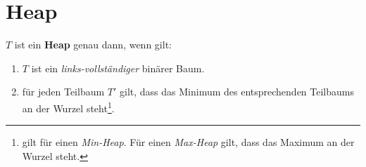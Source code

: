 \section{Heap}

$T$ ist ein \textbf{Heap} genau dann, wenn gilt:

\begin{enumerate}
    \item $T$ ist ein \textit{links-vollständiger} binärer Baum.
    \item für jeden Teilbaum $T'$ gilt, dass das Minimum des entsprechenden Teilbaums an der Wurzel steht\footnote{
    gilt für einen \textit{Min-Heap}. Für einen \textit{Max-Heap} gilt, dass das Maximum an der Wurzel steht.
    }.
\end{enumerate}